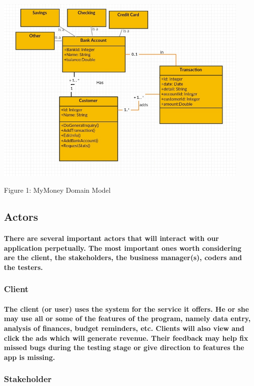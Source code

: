 \documentclass{article}
\begin{document}
\includegraphics[width=12.5cm]{dm.jpg}
\caption{Figure 1: MyMoney Domain Model}




\subsection{Actors}
\paragraph{\indent There are several important actors that will interact with our application perpetually. The most important ones worth considering are the client, the stakeholders, the business manager(s), coders and the testers.}

\subsubsection{Client}
\paragraph{\indent The client (or user) uses the system for the service it offers. He or she may use all or some of the features of the program, namely data entry, analysis of finances, budget reminders, etc. Clients will also view and click the ads which will generate revenue. Their feedback may help fix missed bugs during the testing stage or give direction to features the app is missing.  }

\subsubsection{Stakeholder}
\end{document}
